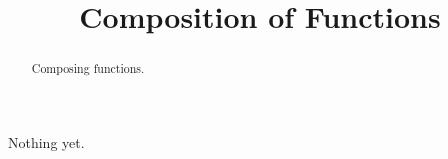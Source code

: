 \documentclass{ximera}
\title{Composition of Functions}
\begin{document}
\begin{abstract}
Composing functions.
\end{abstract}
\maketitle

Nothing yet.
\end{document}
